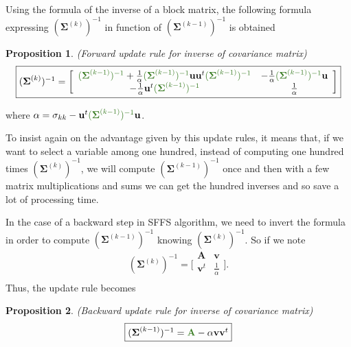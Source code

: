 \documentclass[a4paper,11pt,DIV=16,abstracton]{scrartcl}
\newtheorem{prop}{Proposition}
\begin{document}
        Using the formula of the inverse of a block matrix, the following formula expressing $(\boldsymbol{\Sigma}^{(k)})^{-1}$ in function of $(\boldsymbol{\Sigma}^{(k-1)})^{-1}$ is obtained
        \begin{prop}
        \label{eq:update-inv}
            (Forward update rule for inverse of covariance matrix)
            \begin{equation*}
                \fbox{$
                (\boldsymbol{\Sigma}^{(k)})^{-1} =
                \bigg[\begin{array}{cc}
                \textcolor{OliveGreen}{(\boldsymbol{\Sigma}^{(k-1)})^{-1}} + \frac{1}{\alpha} \textcolor{OliveGreen}{(\boldsymbol{\Sigma}^{(k-1)})^{-1}} \mathbf{u} \mathbf{u}^t \textcolor{OliveGreen}{(\boldsymbol{\Sigma}^{(k-1)})^{-1}} & - \frac{1}{\alpha} \textcolor{OliveGreen}{(\boldsymbol{\Sigma}^{(k-1)})^{-1}} \mathbf{u} \\
                - \frac{1}{\alpha} \mathbf{u}^t \textcolor{OliveGreen}{(\boldsymbol{\Sigma}^{(k-1)})^{-1}}                                                                          & \frac{1}{\alpha}                  \\
                \end{array}\bigg]
                $}
            \end{equation*}
        \end{prop}
        where $ \alpha = \sigma_{kk} - \mathbf{u}^t \textcolor{OliveGreen}{(\boldsymbol{\Sigma}^{(k-1)})^{-1}} \mathbf{u} $.

        To insist again on the advantage given by this update rules, it means that, if we want to select a variable among one hundred, instead of computing one hundred times $(\boldsymbol{\Sigma}^{(k)})^{-1}$, we will compute $(\boldsymbol{\Sigma}^{(k-1)})^{-1}$ once and then with a few matrix multiplications and sums we can get the hundred inverses and so save a lot of processing time.

        In the case of a backward step in SFFS algorithm, we need to invert the formula in order to compute $(\boldsymbol{\Sigma}^{(k-1)})^{-1}$ knowing $(\boldsymbol{\Sigma}^{(k)})^{-1}$. So if we note
        \begin{equation*}
            (\boldsymbol{\Sigma}^{(k)})^{-1} =
            \bigg[\begin{array}{cc}
            \mathbf{A}   & \mathbf{v} \\
            \mathbf{v}^t & \frac{1}{\alpha} \\
            \end{array}\bigg].
        \end{equation*}
        Thus, the update rule becomes
        \begin{prop}
            (Backward update rule for inverse of covariance matrix)
            \begin{equation*}
                \fbox{$(\boldsymbol{\Sigma}^{(k-1)})^{-1} = \textcolor{OliveGreen}{\mathbf{A}} - \alpha \mathbf{v} \mathbf{v}^t$}
            \end{equation*}
        \end{prop}
\end{document}
